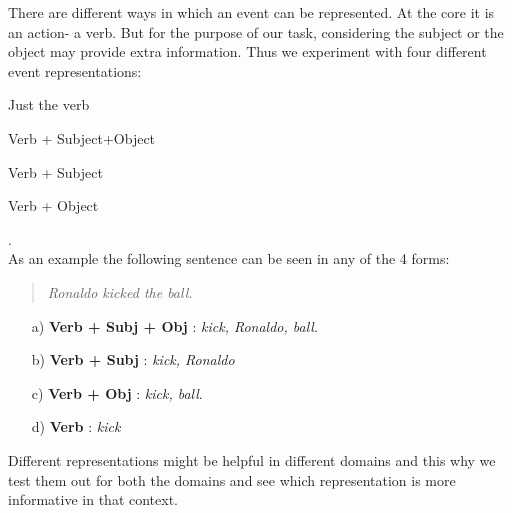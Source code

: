 \documentclass[12pt]{article}
\begin{document}
There are different ways in which an event can be represented. At the core it is an action- a verb. But for the purpose of our task, considering the subject or the object may provide extra information. Thus we experiment with four different event representations: 
\begin{enumerate*}[label=\itshape\alph*\upshape)]
	\item Just the verb
	\item Verb + Subject+Object
	\item Verb + Subject
	\item Verb + Object
\end{enumerate*}. \\ 
As an example the following sentence can be seen in any of the 4 forms:
\begin{quote}
	\textit{Ronaldo kicked the ball.}
\end{quote}
\begin{enumerate}
	\item[a)] \textbf{Verb + Subj + Obj} : \textit{kick, Ronaldo, ball}.
	\item[b)] \textbf{Verb + Subj} : \textit{kick, Ronaldo}
	\item[c)] \textbf{Verb + Obj} : \textit{kick, ball}.
	\item[d)] \textbf{Verb} : \textit{kick}
\end{enumerate}

Different representations might be helpful in different domains and this why we test them out for both the domains and see which representation is more informative in that context.
\end{document}
